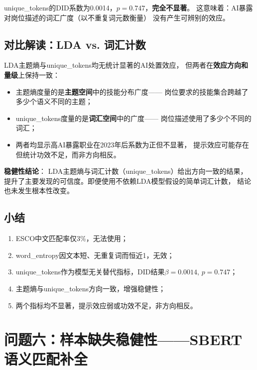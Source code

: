 \documentclass[12pt,a4paper]{ctexart}
\begin{document}
unique\_tokens的DID系数为0.0014，$p=0.747$，\textbf{完全不显著}。
这意味着：AI暴露对岗位描述的词汇广度（以不重复词元数衡量）
没有产生可辨别的效应。

\subsection{对比解读：LDA vs. 词汇计数}

LDA主题熵与unique\_tokens均无统计显著的AI处置效应，
但两者在\textbf{效应方向和量级}上保持一致：

\begin{itemize}
\item 主题熵度量的是\textbf{主题空间}中的技能分布广度——
  岗位要求的技能集合跨越了多少个语义不同的主题；
\item unique\_tokens度量的是\textbf{词汇空间}中的广度——
  岗位描述使用了多少个不同的词汇；
\item 两者均显示高AI暴露职业在2023年后系数为正但不显著，
  提示效应可能存在但统计功效不足，而非方向相反。
\end{itemize}

\textbf{稳健性结论}：
LDA主题熵与词汇计数（unique\_tokens）给出方向一致的结果，
提升了主要发现的可信度。即便使用不依赖LDA模型假设的简单词汇计数，
结论也未发生根本性改变。

\subsection{小结}

\begin{enumerate}
\item ESCO中文匹配率仅3\%，无法使用；
\item word\_entropy因文本短、无重复词而恒近1，无效；
\item unique\_tokens作为模型无关替代指标，DID结果$\beta=0.0014$, $p=0.747$；
\item 主题熵与unique\_tokens方向一致，增强稳健性；
\item 两个指标均不显著，提示效应弱或功效不足，非方向相反。
\end{enumerate}


\section{问题六：样本缺失稳健性——SBERT语义匹配补全}
\label{sec:sbert_robustness}
\end{document}
